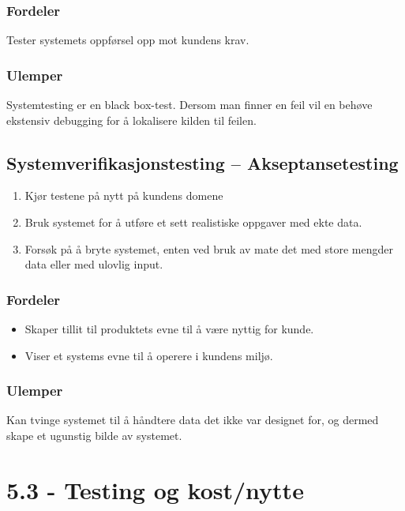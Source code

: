 \subsubsection{Fordeler}

Tester systemets oppførsel opp mot kundens krav.

\subsubsection{Ulemper}

Systemtesting er en black box-test. Dersom man finner en feil vil en
behøve ekstensiv debugging for å lokalisere kilden til feilen.

\subsection{Systemverifikasjonstesting -- Akseptansetesting}

\begin{enumerate}[1.]
\item
  Kjør testene på nytt på kundens domene
\item
  Bruk systemet for å utføre et sett realistiske oppgaver med ekte data.
\item
  Forsøk på å bryte systemet, enten ved bruk av mate det med store
  mengder data eller med ulovlig input.
\end{enumerate}
\subsubsection{Fordeler}

\begin{itemize}
\item
  Skaper tillit til produktets evne til å være nyttig for kunde.
\item
  Viser et systems evne til å operere i kundens miljø.
\end{itemize}
\subsubsection{Ulemper}

Kan tvinge systemet til å håndtere data det ikke var designet for, og
dermed skape et ugunstig bilde av systemet.

\section{5.3 - Testing og kost/nytte}

